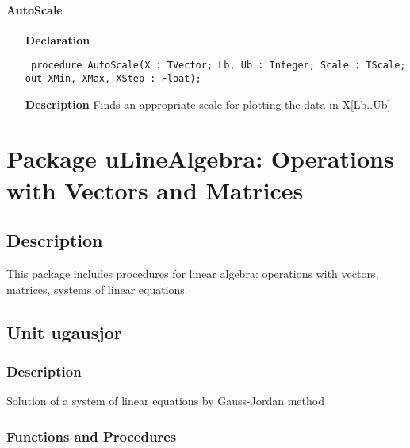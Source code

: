 \documentclass[12pt,a4paper,oneside]{report}
\newcommand{\declarationitem}[1]{\textbf{#1}}
\newcommand{\descriptiontitle}[1]{\textbf{#1}}
\newcommand{\code}[1]{\texttt{#1}}
\begin{document}
\subsubsection{AutoScale}
\label{uScaling-AutoScale}
\begin{itemize}\item[\declarationitem{Declaration}\hfill]
\begin{flushleft}
\code{
procedure AutoScale(X : TVector; Lb, Ub : Integer; Scale : TScale; out XMin, XMax, XStep : Float);}

\end{flushleft}

\par
\item[\descriptiontitle{Description}]
Finds an appropriate scale for plotting the data in X[Lb..Ub]

\end{itemize}

\chapter{Package uLineAlgebra: Operations with Vectors and Matrices}\label{package-ulinealgebra}
\section{Description}
This package includes procedures for linear algebra: operations with vectors, matrices, systems of linear equations.
\section{Unit ugausjor}
\label{ugausjor}
\subsection{Description}
Solution of a system of linear equations by Gauss{-}Jordan method
\subsection{Functions and Procedures}
\end{document}
